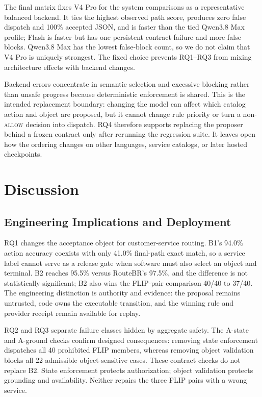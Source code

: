 \documentclass[10pt,conference,a4paper]{IEEEtran}
\newcommand{\method}{RouteBR}
\begin{document}
The final matrix fixes V4 Pro for the system comparisons as a representative balanced backend. It ties the highest observed path score, produces zero false dispatch and 100\% accepted JSON, and is faster than the tied Qwen3.8 Max profile; Flash is faster but has one persistent contract failure and more false blocks. Qwen3.8 Max has the lowest false-block count, so we do not claim that V4 Pro is uniquely strongest. The fixed choice prevents RQ1--RQ3 from mixing architecture effects with backend changes.

Backend errors concentrate in semantic selection and excessive blocking rather than unsafe progress because deterministic enforcement is shared. This is the intended replacement boundary: changing the model can affect which catalog action and object are proposed, but it cannot change rule priority or turn a non-\textsc{allow} decision into dispatch. RQ4 therefore supports replacing the proposer behind a frozen contract only after rerunning the regression suite. It leaves open how the ordering changes on other languages, service catalogs, or later hosted checkpoints.

\section{Discussion}

\subsection{Engineering Implications and Deployment}

RQ1 changes the acceptance object for customer-service routing. B1's 94.0\% action accuracy coexists with only 41.0\% final-path exact match, so a service label cannot serve as a release gate when software must also select an object and terminal. B2 reaches 95.5\% versus \method{}'s 97.5\%, and the difference is not statistically significant; B2 also wins the FLIP-pair comparison 40/40 to 37/40. The engineering distinction is authority and evidence: the proposal remains untrusted, code owns the executable transition, and the winning rule and provider receipt remain available for replay.

RQ2 and RQ3 separate failure classes hidden by aggregate safety. The A-state and A-ground checks confirm designed consequences: removing state enforcement dispatches all 40 prohibited FLIP members, whereas removing object validation blocks all 22 admissible object-sensitive cases. These contract checks do not replace B2. State enforcement protects authorization; object validation protects grounding and availability. Neither repairs the three FLIP pairs with a wrong service.
\end{document}
